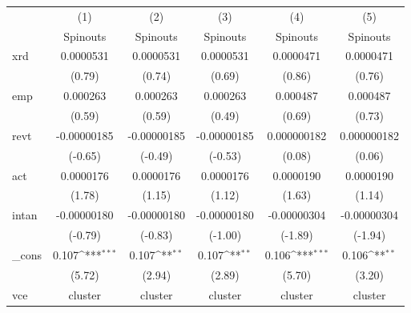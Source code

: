 {
\def\sym#1{\ifmmode^{#1}\else\(^{#1}\)\fi}
\begin{tabular}{l*{5}{c}}
\hline\hline
            &\multicolumn{1}{c}{(1)}&\multicolumn{1}{c}{(2)}&\multicolumn{1}{c}{(3)}&\multicolumn{1}{c}{(4)}&\multicolumn{1}{c}{(5)}\\
            &\multicolumn{1}{c}{Spinouts}&\multicolumn{1}{c}{Spinouts}&\multicolumn{1}{c}{Spinouts}&\multicolumn{1}{c}{Spinouts}&\multicolumn{1}{c}{Spinouts}\\
\hline
xrd         &   0.0000531         &   0.0000531         &   0.0000531         &   0.0000471         &   0.0000471         \\
            &      (0.79)         &      (0.74)         &      (0.69)         &      (0.86)         &      (0.76)         \\
[1em]
emp         &    0.000263         &    0.000263         &    0.000263         &    0.000487         &    0.000487         \\
            &      (0.59)         &      (0.59)         &      (0.49)         &      (0.69)         &      (0.73)         \\
[1em]
revt        & -0.00000185         & -0.00000185         & -0.00000185         & 0.000000182         & 0.000000182         \\
            &     (-0.65)         &     (-0.49)         &     (-0.53)         &      (0.08)         &      (0.06)         \\
[1em]
act         &   0.0000176         &   0.0000176         &   0.0000176         &   0.0000190         &   0.0000190         \\
            &      (1.78)         &      (1.15)         &      (1.12)         &      (1.63)         &      (1.14)         \\
[1em]
intan       & -0.00000180         & -0.00000180         & -0.00000180         & -0.00000304         & -0.00000304         \\
            &     (-0.79)         &     (-0.83)         &     (-1.00)         &     (-1.89)         &     (-1.94)         \\
[1em]
\_cons      &       0.107\sym{***}&       0.107\sym{**} &       0.107\sym{**} &       0.106\sym{***}&       0.106\sym{**} \\
            &      (5.72)         &      (2.94)         &      (2.89)         &      (5.70)         &      (3.20)         \\
\hline
vce         &     cluster         &     cluster         &     cluster         &     cluster         &     cluster         \\

\end{tabular}}
